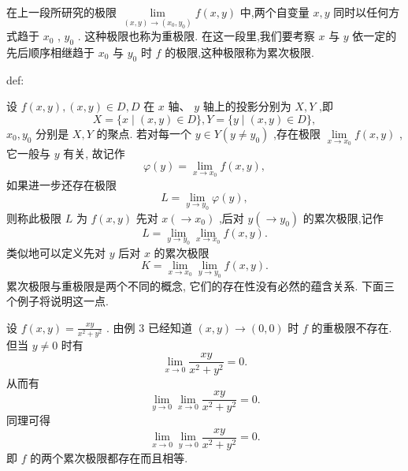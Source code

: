在上一段所研究的极限 \(\mathop{\lim }\limits_{{\left( {x,y}\right)  \rightarrow  \left( {{x}_{0},{y}_{0}}\right) }}f\left( {x,y}\right)\) 中,两个自变量 \(x,y\) 同时以任何方式趋于 \({x}_{0}\) , \({y}_{0}\) . 这种极限也称为重极限. 在这一段里,我们要考察 \(x\) 与 \(y\) 依一定的先后顺序相继趋于 \({x}_{0}\) 与 \({y}_{0}\) 时 \(f\) 的极限,这种极限称为累次极限.

\begin{definition}{}{def:}

\end{definition}
设 \(f\left( {x,y}\right) ,\left( {x,y}\right)  \in  D,D\) 在 \(x\) 轴、 \(y\) 轴上的投影分别为 \(X,Y\) ,即
\[
X = \{ x \mid  \left( {x,y}\right)  \in  D\} ,Y = \{ y \mid  \left( {x,y}\right)  \in  D\} ,
\]
\({x}_{0},{y}_{0}\) 分别是 \(X,Y\) 的聚点. 若对每一个 \(y \in  Y\left( {y \neq  {y}_{0}}\right)\) ,存在极限 \(\mathop{\lim }\limits_{{x \rightarrow  {x}_{0}}}f\left( {x,y}\right)\) ,它一般与 \(y\) 有关, 故记作
\[
\varphi \left( y\right)  = \mathop{\lim }\limits_{{x \rightarrow  {x}_{0}}}f\left( {x,y}\right) ,
\]
如果进一步还存在极限
\[
L = \mathop{\lim }\limits_{{y \rightarrow  {y}_{0}}}\varphi \left( y\right) ,
\]
则称此极限 \(L\) 为 \(f\left( {x,y}\right)\) 先对 \(x\left( { \rightarrow  {x}_{0}}\right)\) ,后对 \(y\left( { \rightarrow  {y}_{0}}\right)\) 的累次极限,记作
\[
L = \mathop{\lim }\limits_{{y \rightarrow  {y}_{0}}}\mathop{\lim }\limits_{{x \rightarrow  {x}_{0}}}f\left( {x,y}\right) .
\]
类似地可以定义先对 \(y\) 后对 \(x\) 的累次极限
\[
K = \mathop{\lim }\limits_{{x \rightarrow  {x}_{0}}}\mathop{\lim }\limits_{{y \rightarrow  {y}_{0}}}f\left( {x,y}\right) .
\]
累次极限与重极限是两个不同的概念, 它们的存在性没有必然的蕴含关系. 下面三个例子将说明这一点.

\begin{example}

\end{example}
设 \(f\left( {x,y}\right)  = \frac{xy}{{x}^{2} + {y}^{2}}\) . 由例 3 已经知道 \(\left( {x,y}\right)  \rightarrow  \left( {0,0}\right)\) 时 \(f\) 的重极限不存在. 但当 \(y \neq  0\) 时有
\[
\mathop{\lim }\limits_{{x \rightarrow  0}}\frac{xy}{{x}^{2} + {y}^{2}} = 0.
\]
从而有
\[
\mathop{\lim }\limits_{{y \rightarrow  0}}\mathop{\lim }\limits_{{x \rightarrow  0}}\frac{xy}{{x}^{2} + {y}^{2}} = 0.
\]
同理可得
\[
\mathop{\lim }\limits_{{x \rightarrow  0}}\mathop{\lim }\limits_{{y \rightarrow  0}}\frac{xy}{{x}^{2} + {y}^{2}} = 0.
\]
即 \(f\) 的两个累次极限都存在而且相等.

